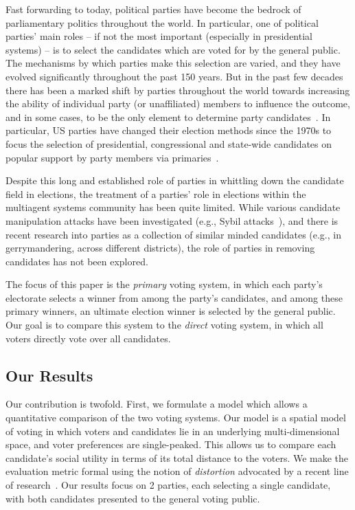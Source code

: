 \documentclass[letterpaper]{article} %
\theoremstyle{definition}
\begin{document}
Fast forwarding to today, political parties have become the bedrock of parliamentary politics throughout the world. In particular, one of political parties' main roles -- if not the most important (especially in presidential systems) -- is to select the candidates which are voted for by the general public. The mechanisms by which parties make this selection are varied, and they have evolved significantly throughout the past 150 years. But in the past few decades there has been a marked shift by parties throughout the world towards increasing the ability of individual party (or unaffiliated) members to influence the outcome, and in some cases, to be the only element to determine party candidates~\cite{CB11}. In particular, US parties have changed their election methods since the 1970s to focus the selection of presidential, congressional and state-wide candidates on popular support by party members via primaries~\cite{CKNZ08}.

Despite this long and established role of parties in whittling down the candidate field in elections, the treatment of a parties' role in elections within the multiagent systems community has been quite limited. While various candidate manipulation attacks have been investigated (e.g., Sybil attacks~\cite{CM10}), and there is recent research into parties as a collection of similar minded candidates (e.g., in gerrymandering, across different districts), the role of parties in removing candidates has not been explored.



The focus of this paper is the \emph{primary} voting system, in which each party's electorate selects a winner from among the party's candidates, and among these primary winners, an ultimate election winner is selected by the general public. Our goal is to compare this system to the \emph{direct} voting system, in which all voters directly vote over all candidates.

\subsection{Our Results}
Our contribution is twofold. First, we formulate a model which allows a quantitative comparison of the two voting systems. Our model is a spatial model of voting in which voters and candidates lie in an underlying multi-dimensional space, and voter preferences are single-peaked. This allows us to compare each candidate's social utility in terms of its total distance to the voters. We make the evaluation metric formal using the notion of \emph{distortion} advocated by a recent line of research~\cite{PR06,BCHL+15}. Our results focus on 2 parties, each selecting a single candidate, with both candidates presented to the general voting public.
\end{document}
